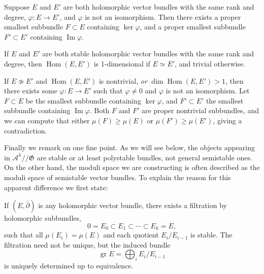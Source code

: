 \documentclass[12pt,letterpaper,reqno]{article}
\numberwithin{equation}{section}
\newcommand{\fG}{{\mathfrak G}}
\newcommand{\cA}{\ensuremath{\mathcal A}}
\newcommand{\kq}{/\!\!/}
\newcommand{\ti}[1]{\textit{#1}}
\DeclareMathOperator{\im}{Im}
\DeclareMathOperator{\Hom}{Hom}
\DeclareMathOperator{\gr}{gr}
\newcommand{\fixme}[1]{{\color{orange}{[#1]}}}
\begin{document}
\begin{lem} \label{lem:saturation-of-bundle-maps}
Suppose $E$ and $E'$ are both
holomorphic vector bundles with the same rank and degree,
$\varphi: E \to E'$, and $\varphi$ is not an isomorphism.
Then there exists a proper smallest subbundle $F \subset E$ containing
$\ker \varphi$, and a proper smallest subbundle $F' \subset E'$
containing $\im \varphi$. \fixme{check}
\end{lem}
\begin{pf} \fixme{...}
\end{pf}

\begin{prop} If $E$ and $E'$ are both stable
holomorphic vector bundles with the same rank and degree,
then $\Hom(E,E')$ is 1-dimensional if $E \simeq E'$,
and trivial otherwise.
\end{prop}
\begin{pf}
If $E \not \simeq E'$ and $\Hom(E,E')$ is nontrivial, \ti{or}
$\dim \Hom(E,E') > 1$, then there exists some $\varphi: E \to E'$
such that $\varphi \neq 0$ and $\varphi$ is not an isomorphism.
Let $F \subset E$ be the smallest subbundle containing $\ker \varphi$,
and $F' \subset E'$ the smallest subbundle containing $\im \varphi$.
Both $F$ and $F'$ are proper nontrivial subbundles, and we can compute
that either $\mu(F) \ge \mu(E)$ or $\mu(F') \ge \mu(E')$, giving a
contradiction.
\end{pf}

Finally we remark on one fine point.
As we will see below, the objects appearing in $\cA^h \kq \fG$
are stable or at least polystable bundles,
not general semistable ones. On the other hand, the moduli space
we are constructing is often described as the moduli space of
semistable vector bundles.
To explain the reason for this apparent difference we first state:

\begin{prop}
If $(E, \bar\partial)$ is any holomorphic vector bundle,
there exists a filtration by holomorphic subbundles,
\begin{equation}
 0 = E_0 \subset E_1 \subset \cdots \subset E_k = E,
\end{equation}
such that all $\mu(E_i) = \mu(E)$ and
each quotient $E_i / E_{i-1}$ is stable.
The filtration need not be unique, but the induced
bundle
\begin{equation}
  \gr E = \bigoplus_i E_i / E_{i-1}
\end{equation}
is uniquely determined up to equivalence.
\end{prop}
\end{document}
